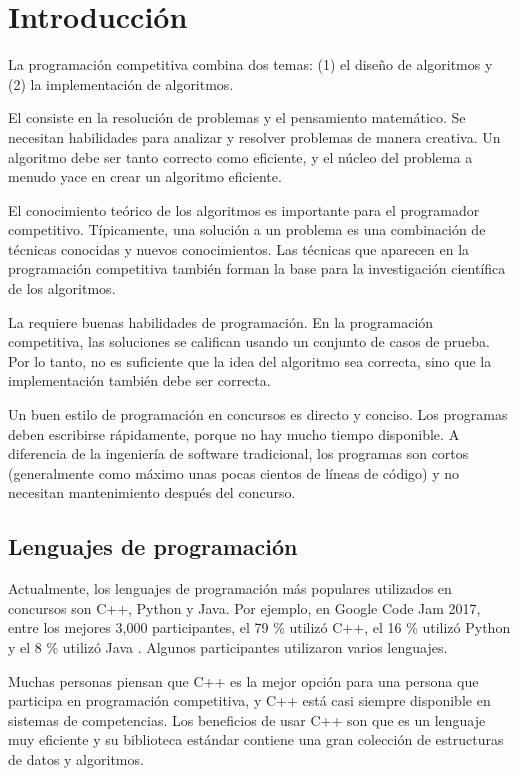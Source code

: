 \chapter{Introducción}

La programación competitiva combina dos temas:
(1) el diseño de algoritmos y (2) la implementación de algoritmos.

El  consiste en la resolución de problemas
y el pensamiento matemático.
Se necesitan habilidades para analizar y resolver problemas
de manera creativa.
Un algoritmo debe ser tanto correcto como eficiente,
y el núcleo del problema a menudo
yace en crear un algoritmo eficiente.

El conocimiento teórico de los algoritmos
es importante para el programador competitivo.
Típicamente, una solución a un problema es
una combinación de técnicas conocidas y
nuevos conocimientos.
Las técnicas que aparecen en la programación competitiva
también forman la base para la investigación científica
de los algoritmos.

La  requiere buenas
habilidades de programación.
En la programación competitiva, las soluciones
se califican usando un conjunto de casos de prueba.
Por lo tanto, no es suficiente que la idea del
algoritmo sea correcta, sino que la implementación también
debe ser correcta.

Un buen estilo de programación en concursos es
directo y conciso.
Los programas deben escribirse rápidamente,
porque no hay mucho tiempo disponible.
A diferencia de la ingeniería de software tradicional,
los programas son cortos (generalmente como máximo unas
pocas cientos de líneas de código) y no necesitan
mantenimiento después del concurso.

\section{Lenguajes de programación}


Actualmente, los lenguajes de programación más populares
utilizados en concursos son C++, Python y Java.
Por ejemplo, en Google Code Jam 2017,
entre los mejores 3,000 participantes,
el 79 \% utilizó C++,
el 16 \% utilizó Python y
el 8 \% utilizó Java \cite{goo17}.
Algunos participantes utilizaron varios lenguajes.

Muchas personas piensan que C++ es la mejor opción
para una persona que participa en programación competitiva,
y C++ está casi siempre disponible en
sistemas de competencias.
Los beneficios de usar C++ son que
es un lenguaje muy eficiente y
su biblioteca estándar contiene una
gran colección
de estructuras de datos y algoritmos.

